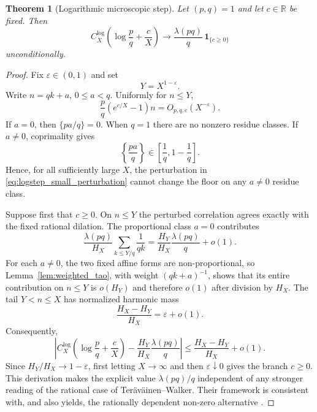 \documentclass[preprint,12pt]{elsarticle}
\numberwithin{equation}{section}
\theoremstyle{plain}
\newtheorem{theorem}{Theorem}[section]
\theoremstyle{definition}
\theoremstyle{remark}
\begin{document}
\begin{theorem}[Logarithmic microscopic step]
\label{thm:logstep}
Let $(p,q)=1$ and let $c\in\mathbb R$ be fixed. Then
\begin{equation}
C_X^{\log}\!\left(\log\frac pq+\frac cX\right)
\longrightarrow
\frac{\lambda(pq)}q\,\mathbf 1_{\{c\ge0\}}
\label{eq:logstep}
\end{equation}
unconditionally.
\end{theorem}

\begin{proof}
Fix $\varepsilon\in(0,1)$ and set
\begin{equation}
Y=X^{1-\varepsilon}.
\label{eq:logstep_Y}
\end{equation}
Write $n=qk+a$, $0\le a<q$. Uniformly for $n\le Y$,
\begin{equation}
\frac pq(e^{c/X}-1)n=O_{p,q,c}(X^{-\varepsilon}).
\label{eq:logstep_small_perturbation}
\end{equation}
If $a=0$, then $\{pa/q\}=0$. When $q=1$ there are no nonzero residue classes. If $a\ne0$, coprimality gives
\begin{equation}
\left\{\frac{pa}{q}\right\}\in
\left[\frac1q,1-\frac1q\right].
\label{eq:logstep_fractional_separation}
\end{equation}
Hence, for all sufficiently large $X$, the perturbation in
\eqref{eq:logstep_small_perturbation} cannot change the floor on any
$a\ne0$ residue class.

Suppose first that $c\ge0$. On $n\le Y$ the perturbed correlation agrees
exactly with the fixed rational dilation. The proportional class $a=0$
contributes
\begin{equation}
\frac{\lambda(pq)}{H_X}
\sum_{k\le Y/q}\frac1{qk}
=
\frac{H_Y}{H_X}\frac{\lambda(pq)}q+o(1).
\label{eq:logstep_prop_initial}
\end{equation}
For each $a\ne0$, the two fixed affine forms are non-proportional, so
Lemma~\ref{lem:weighted_tao}, with weight $(qk+a)^{-1}$, shows that its
entire contribution on $n\le Y$ is $o(H_Y)$ and therefore $o(1)$ after
division by $H_X$. The tail $Y<n\le X$ has normalized harmonic mass
\begin{equation}
\frac{H_X-H_Y}{H_X}=\varepsilon+o(1).
\label{eq:logstep_tail_mass}
\end{equation}
Consequently,
\begin{equation}
\left|
C_X^{\log}\!\left(\log\frac pq+\frac cX\right)
-\frac{H_Y}{H_X}\frac{\lambda(pq)}q
\right|
\le
\frac{H_X-H_Y}{H_X}+o(1).
\label{eq:logstep_bilateral}
\end{equation}
Since $H_Y/H_X\to1-\varepsilon$, first letting $X\to\infty$ and then
$\varepsilon\downarrow0$ gives the branch $c\ge0$. This derivation makes the
explicit value $\lambda(pq)/q$ independent of any stronger reading of the
rational case of Ter\"av\"ainen--Walker. Their framework is consistent with,
and also yields, the rationally dependent non-zero alternative
\cite[Theorem~1.2(3)]{TeravainenWalker2025}.


\end{proof}
\end{document}
